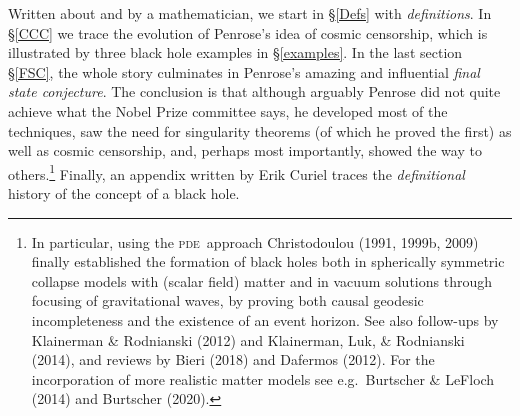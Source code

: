 \documentclass[11pt,a4paper]{article}
\newcommand{\pde}{\textsc{pde}}
\begin{document}
Written about and by a mathematician, we start in \S\ref{Defs} with \emph{definitions}. In \S\ref{CCC}
we trace the evolution of Penrose's idea of cosmic censorship, which is illustrated by three black hole examples in \S\ref{examples}. In the last section \S\ref{FSC}, the whole story culminates in Penrose's amazing and influential \emph{final state conjecture}.
The conclusion is that although arguably Penrose did not quite achieve what the Nobel Prize committee says, he developed most of the  techniques, saw the need for  singularity theorems (of which he proved the first) as well as cosmic censorship, and, perhaps most importantly,  showed the way to others.\footnote{\label{fnAB} 
In particular, using the \pde\ approach   Christodoulou (1991, 1999b,  2009) finally established  the formation of  black holes both in spherically symmetric collapse models with (scalar field) matter and in vacuum solutions through focusing of gravitational waves, by proving both causal geodesic incompleteness and the existence of an event horizon. See also follow-ups by Klainerman \& Rodnianski (2012) and  Klainerman, Luk, \& Rodnianski (2014), and reviews by Bieri (2018) and Dafermos (2012). For the incorporation of more realistic matter models see e.g.\ 
Burtscher \& LeFloch  (2014) and  Burtscher (2020).}
Finally, an appendix written by Erik Curiel traces the \emph{definitional} history of the concept of a black hole.
\end{document}
